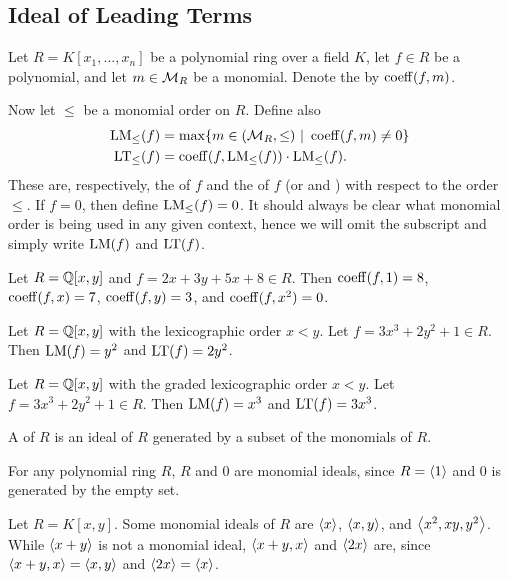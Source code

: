 
\subsection{Ideal of Leading Terms}

Let $R = K[x_1, \ldots, x_n]$ be a polynomial ring over a field $K$,
let $f \in R$ be a polynomial, and let $m \in \cal M_R$ be a monomial.
Denote the  by $\coeff(f, m)$.

Now let $\leq$ be a monomial order on $R$.
Define also
\begin{align*}
  \LM_\leq(f) &= \max\{ m \in (\cal M_R, \leq) ~|~ \coeff(f, m) \neq 0\} \\
  \LT_\leq(f) &= \coeff(f, \LM_\leq(f)) \cdot \LM_\leq(f).
\end{align*}
These are, respectively, the  of $f$ and the  of $f$
(or  and )
with respect to the order $\leq$.
If $f = 0$, then define $\LM_\leq(f) = 0$.
It should always be clear what monomial order is being used in any given context, 
hence we will omit the subscript and simply write $\LM(f)$ and $\LT(f)$.

\begin{example}
  Let $R = \bb Q[x,y]$ and $f = 2x + 3y + 5x + 8 \in R$.
  Then $\coeff(f, 1) = 8$, $\coeff(f, x) = 7$, $\coeff(f, y) = 3$, and $\coeff(f, x^2) = 0$.
\end{example}
\begin{example}
  Let $R = \bb Q[x,y]$ with the lexicographic order $x < y$.
  Let $f = 3x^3 + 2y^2 + 1 \in R$.
  Then $\LM(f) = y^2$ and $\LT(f) = 2y^2$.
\end{example}
\begin{example}
  Let $R = \bb Q[x,y]$ with the graded lexicographic order $x < y$.
  Let $f = 3x^3 + 2y^2 + 1 \in R$.
  Then $\LM(f) = x^3$ and $\LT(f) = 3x^3$.
\end{example}

A  of $R$ is an ideal of $R$ generated by a subset of the monomials of $R$.
\begin{example}
  For any polynomial ring $R$, $R$ and $0$ are monomial ideals,
  since $R = \pid 1$ and $0$ is generated by the empty set.
\end{example}
\begin{example}
  Let $R = K[x,y]$.
  Some monomial ideals of $R$ are $\pid x$, $\pid{x,y}$, and $\pid{x^2, xy, y^2}$.
  While $\pid{x + y}$ is not a monomial ideal, $\pid{x + y, x}$ and $\pid{2x}$ are,
  since $\pid{x + y, x} = \pid{x, y}$ and $\pid{2x} = \pid x$.
\end{example}

